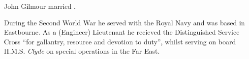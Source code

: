 
John Gilmour married .

During the Second World War he served with the Royal Navy and was based in Eastbourne. As a (Engineer) Lieutenant he recieved the Distinguished Service Cross ``for gallantry, resource and devotion to duty'', whilst serving on board H.M.S. \emph{Clyde} on special operations in the Far East.\cite{LondonGazette1945}
